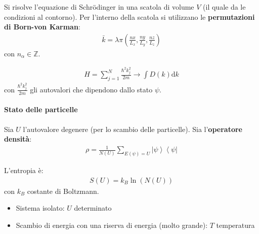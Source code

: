 Si risolve l'equazione di Schrödinger in una scatola di volume $V$ (il quale da le condizioni al contorno). Per l'interno della scatola si utilizzano le \textbf{permutazioni di Born-von Karman}:
\begin{equation}\begin{split}
\bar k=\lambda\pi\left(\frac{nx}{L_x},\frac{ny}{L_y},\frac{nz}{L_z}\right)
\end{split}\end{equation}
con $n_{\alpha}\in \mathbb{Z}$.


\begin{equation}\begin{split}
H=\sum_{j=1}^{N}{\frac{\hbar ^2k_j^2}{2m}}\rightarrow\int{D\left(k\right)\textrm{d}k}
\end{split}\end{equation}
con $\frac{\hbar ^2k_j^2}{2m}$ gli autovalori che dipendono dallo stato $\psi $.

\paragraph{Stato delle particelle} %
Sia $U$ l'autovalore degenere (per lo scambio delle particelle). Sia l'\textbf{operatore densità}:
\begin{equation}\begin{split}
\rho=\frac{1}{N\left(U\right)}\sum_{E\left(\psi \right)=U}{\left |\psi  \right\rangle\left\langle \psi \right |}
\end{split}\end{equation} 

L'entropia è:
\begin{equation}\begin{split}
S\left(U\right)=k_B\ln{\left(N\left(U\right)\right)}
\end{split}\end{equation}
con $k_B$ costante di Boltzmann.
\begin{itemize}
\item Sistema isolato: $U$ determinato
\item Scambio di energia con una riserva di energia (molto grande): $T$ temperatura
\end{itemize}

